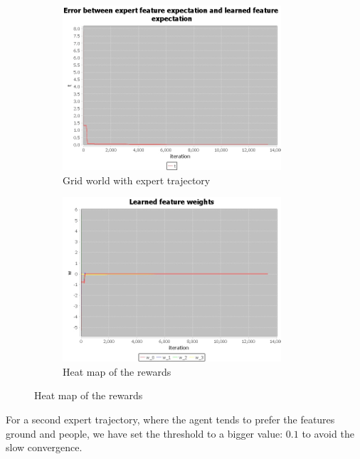 \documentclass[10pt,a4paper,twocolumn]{article}
\begin{document}
\begin{figure}
\begin{subfigure}[b]{0.5\textwidth}
	\includegraphics[width=\textwidth]{experiment_1_t}
	\caption{Grid world with expert trajectory}
	\label{fig:experiment1t}
\end{subfigure}
\begin{subfigure}[b]{0.5\textwidth}
	\includegraphics[width=\textwidth]{experiment_1_w}
	\caption{Heat map of the rewards}
	\label{fig:experiment1w}
\end{subfigure}
\end{figure}

For a second expert trajectory, where the agent tends to prefer the features ground and people, we have set the threshold to a bigger value: $0.1$ to avoid the slow convergence. 
\end{document}
